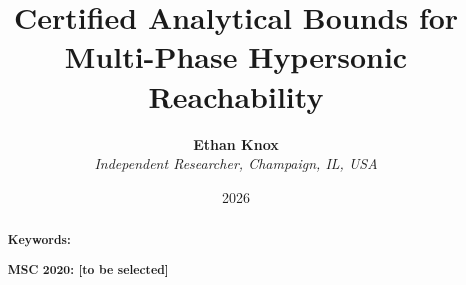\documentclass[english,11pt]{extarticle}
\numberwithin{equation}{section}
\numberwithin{figure}{section}
\numberwithin{table}{section}
\theoremstyle{plain}%
\theoremstyle{definition}%
\theoremstyle{definition}%
\theoremstyle{remark}%
\begin{document}
\title{\textbf{Certified Analytical Bounds for Multi-Phase Hypersonic Reachability}}
\author{\textbf{Ethan Knox}\\
\textit{Independent Researcher, Champaign, IL, USA}}
\date{2026}
\maketitle

\begin{abstract}

\bigskip{}

\textbf{Keywords:} 

\medskip{}
\noindent\textbf{MSC 2020: [to be selected]}

\end{abstract}
\pagebreak{}

\tableofcontents{}
\pagebreak{}


\pagebreak{}


\pagebreak{}


\pagebreak{}


\pagebreak{}


\pagebreak{}


\pagebreak{}


\pagebreak{}



\pagebreak{}

\appendix




\end{document}
